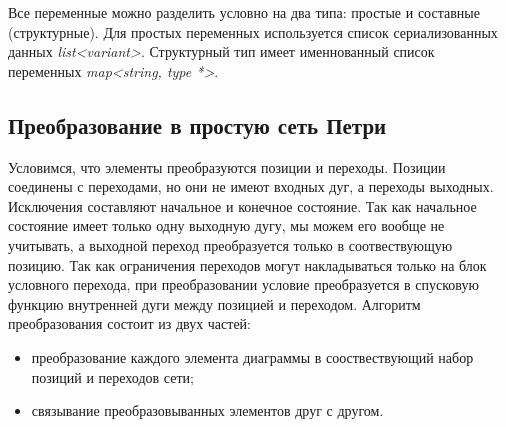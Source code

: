 Все переменные можно разделить условно на два типа: простые и составные (структурные). Для простых переменных используется список сериализованных данных \textit{list<variant>}. Структурный тип имеет именнованный список переменных \textit{map<string, type *>}.	

\subsection{Преобразование в простую сеть Петри}

Условимся, что элементы преобразуются позиции и переходы. Позиции соединены с переходами, но они не имеют входных дуг, а переходы выходных. Исключения составляют начальное и конечное состояние. Так как начальное состояние имеет только одну выходную дугу, мы можем его вообще не учитывать, а выходной переход преобразуется только в соотвествующую позицию. Так как ограничения переходов могут накладываться только на блок условного перехода, при преобразовании условие преобразуется в спусковую функцию внутренней дуги между позицией и переходом.
Алгоритм преобразования состоит из двух частей:
\begin{itemize}
\item преобразование каждого элемента диаграммы в сооствествующий набор позиций и переходов сети;
\item связывание преобразовыванных элементов друг с другом.
\end{itemize}

